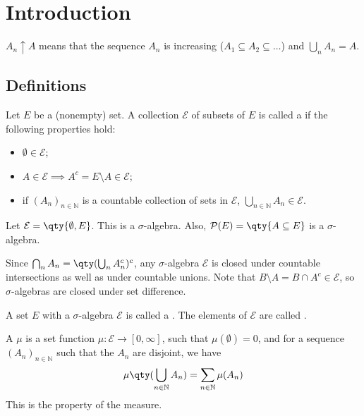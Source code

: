 \section{Introduction}

\begin{notation}
	$A_n \uparrow A$ means that the sequence $A_n$ is increasing ($A_1 \subseteq A_2 \subseteq \dots$) and $\bigcup_n A_n = A$.
\end{notation}

\subsection{Definitions}

\begin{definition}
	Let $E$ be a (nonempty) set. A collection $\mathcal E$ of subsets of $E$ is called a  if the following properties hold:
	\begin{itemize}
		\item $\emptyset \in \mathcal E$;
		\item $A \in \mathcal E \implies A^c = E \setminus A \in \mathcal E$;
		\item if $(A_n)_{n \in \mathbb N}$ is a countable collection of sets in $\mathcal E$, $\bigcup_{n \in \mathbb N} A_n \in \mathcal E$.
	\end{itemize}
\end{definition}

\begin{example}
	Let $\mathcal E = \qty{\emptyset, E}$.
	This is a $\sigma$-algebra.
	Also, $\mathcal P(E) = \qty{A \subseteq E}$ is a $\sigma$-algebra.
\end{example}

\begin{remark}
	Since $\bigcap_n A_n = \qty(\bigcup_n A_n^c)^c$, any $\sigma$-algebra $\mathcal E$ is closed under countable intersections as well as under countable unions.
	Note that $B \setminus A = B \cap A^c \in \mathcal E$, so $\sigma$-algebras are closed under set difference.
\end{remark}

\begin{definition}
	A set $E$ with a $\sigma$-algebra $\mathcal E$ is called a .
	The elements of $\mathcal E$ are called .
\end{definition}

\begin{definition}[Measure]
	A  $\mu$ is a set function $\mu : \mathcal E \to [0,\infty]$, such that $\mu(\emptyset) = 0$, and for a sequence $(A_n)_{n \in \mathbb N}$ such that the $A_n$ are disjoint, we have
	\[ \mu\qty(\bigcup_{n \in \mathbb N} A_n) = \sum_{n \in \mathbb N} \mu(A_n) \]
	This is the  property of the measure.
\end{definition}

